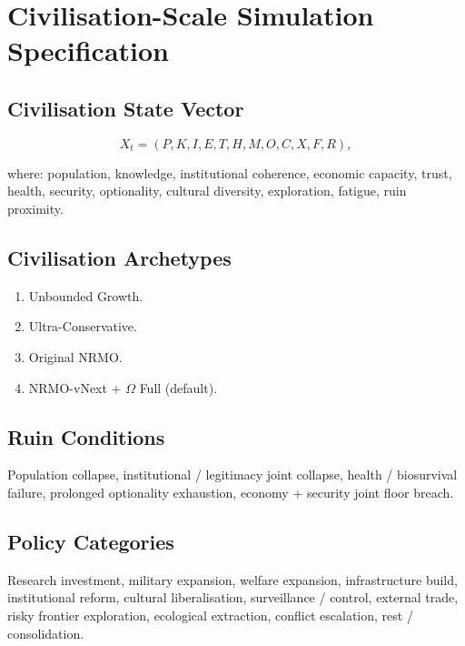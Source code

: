 \section{Civilisation-Scale Simulation Specification}
\label{sec:omega-civ-scale}

\subsection{Civilisation State Vector}
\label{sec:omega-civ-state}

\begin{equation}
X_t = (P, K, I, E, T, H, M, O, C, X, F, R),
\label{eq:omega-civ-state}
\end{equation}

where: population, knowledge, institutional coherence, economic
capacity, trust, health, security, optionality, cultural diversity,
exploration, fatigue, ruin proximity.

\subsection{Civilisation Archetypes}
\label{sec:omega-archetypes}

\begin{enumerate}
\item Unbounded Growth.
\item Ultra-Conservative.
\item Original NRMO.
\item NRMO-vNext + $\Omega$ Full (default).
\end{enumerate}

\subsection{Ruin Conditions}
\label{sec:omega-civ-ruin}

Population collapse, institutional / legitimacy joint collapse,
health / biosurvival failure, prolonged optionality exhaustion,
economy + security joint floor breach.

\subsection{Policy Categories}
\label{sec:omega-policy-categories}

Research investment, military expansion, welfare expansion,
infrastructure build, institutional reform, cultural liberalisation,
surveillance / control, external trade, risky frontier exploration,
ecological extraction, conflict escalation, rest / consolidation.

